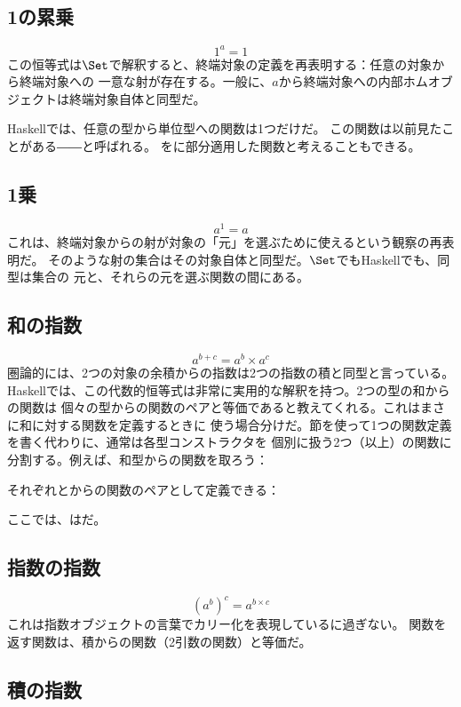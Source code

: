 \subsection{1の累乗}

\[1^{a} = 1\]
この恒等式は$\Set$で解釈すると、終端対象の定義を再表明する：任意の対象から終端対象への
一意な射が存在する。一般に、$a$から終端対象への内部ホムオブジェクトは終端対象自体と同型だ。

Haskellでは、任意の型から単位型への関数は1つだけだ。
この関数は以前見たことがある――と呼ばれる。
を\code{()}に部分適用した関数と考えることもできる。

\subsection{1乗}

\[a^{1} = a\]
これは、終端対象からの射が対象の「元」を選ぶために使えるという観察の再表明だ。
そのような射の集合はその対象自体と同型だ。$\Set$でもHaskellでも、同型は集合の
元と、それらの元を選ぶ関数の間にある。

\subsection{和の指数}

\[a^{b+c} = a^{b} \times a^{c}\]
圏論的には、2つの対象の余積からの指数は2つの指数の積と同型と言っている。
Haskellでは、この代数的恒等式は非常に実用的な解釈を持つ。2つの型の和からの関数は
個々の型からの関数のペアと等価であると教えてくれる。これはまさに和に対する関数を定義するときに
使う場合分けだ。節を使って1つの関数定義を書く代わりに、通常は各型コンストラクタを
個別に扱う2つ（以上）の関数に分割する。例えば、和型からの関数を取ろう：

それぞれとからの関数のペアとして定義できる：

ここでは、はだ。

\subsection{指数の指数}

\[(a^{b})^{c} = a^{b \times c}\]
これは指数オブジェクトの言葉でカリー化を表現しているに過ぎない。
関数を返す関数は、積からの関数（2引数の関数）と等価だ。

\subsection{積の指数}

